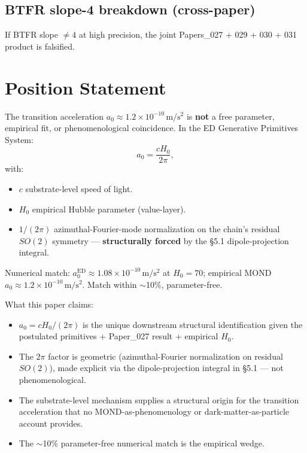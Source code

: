 \documentclass[11pt,a4paper]{article}
\begin{document}
\subsection{BTFR slope-4 breakdown (cross-paper)}

If BTFR slope $\neq 4$ at high precision, the joint Papers\_027 + 029 + 030 + 031 product is falsified.

\section{Position Statement}

The transition acceleration $a_0 \approx 1.2 \times 10^{-10}\,\mathrm{m/s^2}$ is \textbf{not} a free parameter, empirical fit, or phenomenological coincidence. In the ED Generative Primitives System:
\[
a_0 = \frac{cH_0}{2\pi},
\]
with:

\begin{itemize}[noitemsep]
\item $c$ substrate-level speed of light.
\item $H_0$ empirical Hubble parameter (value-layer).
\item $1/(2\pi)$ azimuthal-Fourier-mode normalization on the chain's residual $SO(2)$ symmetry --- \textbf{structurally forced} by the \S5.1 dipole-projection integral.
\end{itemize}

Numerical match: $a_0^\mathrm{ED} \approx 1.08 \times 10^{-10}\,\mathrm{m/s^2}$ at $H_0 = 70$; empirical MOND $a_0 \approx 1.2 \times 10^{-10}\,\mathrm{m/s^2}$. Match within $\sim$10\%, parameter-free.

What this paper claims:

\begin{itemize}[noitemsep]
\item $a_0 = cH_0/(2\pi)$ is the unique downstream structural identification given the postulated primitives + Paper\_027 result + empirical $H_0$.
\item The $2\pi$ factor is geometric (azimuthal-Fourier normalization on residual $SO(2)$), made explicit via the dipole-projection integral in \S5.1 --- not phenomenological.
\item The substrate-level mechanism supplies a structural origin for the transition acceleration that no MOND-as-phenomenology or dark-matter-as-particle account provides.
\item The $\sim$10\% parameter-free numerical match is the empirical wedge.
\end{itemize}
\end{document}
